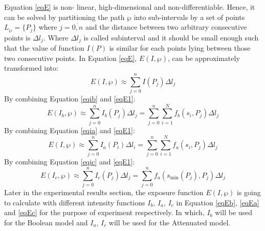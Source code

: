 \documentclass[final]{elsarticle}
\begin{document}
Equation \eqref{eqE} is non- linear, high-dimensional and non-differentiable. Hence,
it can be solved by partitioning the path $\wp $ into sub-intervals by a set
of points ${L_\wp } = \{ {P_j}\} $ where $j = \overline {0,n} $ and the distance between two arbitrary consecutive points is $\Delta l_j$. Where $\Delta l_j$ is called subinterval and it should be small enough such that the value of function $ {I(P)} $ is similar for each points
lying between those two consecutive points. In Equation \eqref{eqE}, $ E(I,\wp ) $, can be approximately transformed into:
\begin{equation}
\label{eqE1}
E(I,\wp ) \approx \sum\limits_{j = 0}^n {I(P_j)\Delta l_j} 
\end{equation}
By combining Equation \eqref{eqib} and \eqref{eqE1}:
\begin{equation}
\label{eqEb}
E(I_b,\wp ) \approx \sum\limits_{j = 0}^n {{I_b}(P_j)\Delta l_j}  = \sum\limits_{j = 0}^n {\sum\limits_{i = 1}^N {f_b(s_i,P_j)} } \Delta l_j
\end{equation}
By combining Equation \eqref{eqia} and \eqref{eqE1}:
\begin{equation}
\label{eqEa}
E(I,\wp ) \approx \sum\limits_{j = 0}^n {I_a(P_i)\Delta l_i}  = \sum\limits_{j = 0}^n {\sum\limits_{i = 1}^N {f_a({s_i},{P_j})} } \Delta l_j
\end{equation}
By combining Equation \eqref{eqic} and \ref{eqE1}:
\begin{equation}
\label{eqEc}
E(I_c,\wp ) \approx \sum\limits_{j = 0}^n {I_c(P_j)\Delta {l_j}}  = \sum\limits_{j = 0}^n {f_a(s_{\min }(P_j),P_j)} \Delta l_j
\end{equation}
 Later in the experimental results section, the exposure function $ E(I,\wp )$ is going to calculate with different intensity functions $ I_b $,  $ I_a $, $ I_c$ in Equation \eqref{eqEb}, \eqref{eqEa} and \eqref{eqEc} for the purpose of experiment respectively. In which, $ I_b $ will be used for the Boolean model and $ I_a $, $ I_c$ will be used for the Attenuated model.
\end{document}
